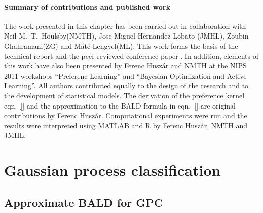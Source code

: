 

\paragraph{Summary of contributions and published work} The work presented in this chapter has been carried out in collaboration with Neil M.\ T.\ Houlsby(NMTH), Jose Miguel Hernandez-Lobato (JMHL), Zoubin Ghahramani(ZG) and M\'{a}t\'{e} Lengyel(ML). This work forms the basis of the technical report \citep{arxivBALD} and the peer-reviewed conference paper \citep{NIPS2012}. In addition, elements of this work have also been presented by Ferenc Husz\'{a}r and NMTH at the NIPS 2011 workshops ``Preferenc Learning'' and ``Bayesian Optimization and Active Learning''. All authors contributed equally to the design of the research and to the development of statistical models. The derivation of the preference kernel eqn.\ \eqref{} and the approximation to the BALD formula in eqn.\ \eqref{} are original contributions by Ferenc Husz\'{a}r. Computational experiments were run and the results were interpreted using MATLAB and R by Ferenc Husz\'{a}r, NMTH and JMHL.
\section{Gaussian process classification}

\subsection{Approximate BALD for GPC}


